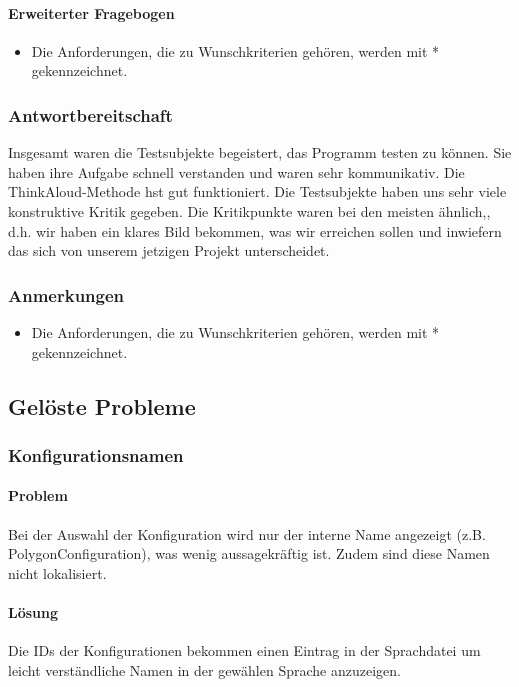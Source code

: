 \paragraph{Erweiterter Fragebogen}
\begin{itemize}
  \item Die Anforderungen, die zu Wunschkriterien gehören, werden mit * gekennzeichnet.
\end{itemize}
\subsubsection{Antwortbereitschaft}
     
     Insgesamt waren die Testsubjekte begeistert, das Programm testen zu können. Sie haben ihre Aufgabe schnell verstanden und waren sehr kommunikativ. Die ThinkAloud-Methode hst gut funktioniert. Die Testsubjekte haben uns sehr viele konstruktive Kritik gegeben. Die Kritikpunkte waren bei den meisten ähnlich,, d.h. wir haben ein klares Bild bekommen, was wir erreichen sollen und inwiefern das sich von unserem jetzigen Projekt unterscheidet.

\subsubsection{Anmerkungen}

\begin{itemize}
  \item Die Anforderungen, die zu Wunschkriterien gehören, werden mit * gekennzeichnet.
\end{itemize}

\subsection{Gelöste Probleme}

\subsubsection{Konfigurationsnamen}
\paragraph{Problem}
Bei der Auswahl der Konfiguration wird nur der interne Name angezeigt (z.B. PolygonConfiguration),
was wenig aussagekräftig ist. Zudem sind diese Namen nicht lokalisiert.

\paragraph{Lösung}
Die IDs der Konfigurationen bekommen einen Eintrag in der Sprachdatei um leicht verständliche
Namen in der gewählen Sprache anzuzeigen.

